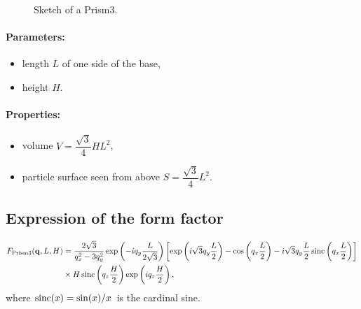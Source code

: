 \begin{figure}[ht]
\hfill
{}
\hfill
{}
\hfill
\caption{Sketch of a Prism3.}
\label{fig:prism3}
\end{figure}

\FloatBarrier

\paragraph{Parameters:}
\begin{itemize}
\item length $L$ of one side of the base, 
\item height $H$.
\end{itemize}

\paragraph{Properties:}
\begin{itemize}
\item volume $V= \dfrac{\sqrt{3}}{4} H L^2$,
\item particle surface seen from above $S =\dfrac{\sqrt{3}}{4}L^2$.
\end{itemize}

\subsection{Expression of the form factor}
\begin{align*}
F_{\rm{Prism3}}(\mathbf{q},L, H) &= \frac{2 \sqrt{3}}{q_x^2-3q_y^2}  \exp\left(-i q_y\frac{L}{2\sqrt{3}}\right)\left[\exp\left(i \sqrt{3} q_y \frac{L}{2} \right)-\cos\left(q_x \frac{L}{2}\right)-i \sqrt{3} q_y \frac{L}{2} \operatorname{sinc}\left(q_x \frac{L}{2}\right) \right] \\
  &
\times  H \operatorname{sinc}\left(q_z \frac{H}{2} \right) \exp\left(i q_z \frac{H}{2}\right),
\end{align*}
where $\operatorname{sinc}(x)=\sin(x)/x$ is the cardinal sine.


